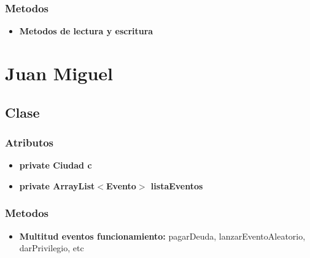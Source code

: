 \documentclass[12pt,a4paper]{article}
\begin{document}
        \subsubsection{Metodos}
        \begin{itemize}
            \item \textbf{Metodos de lectura y escritura}
        \end{itemize}

\section{Juan Miguel}
    \subsection{Clase }
        \subsubsection{Atributos}
        \begin{itemize}
        \item \textbf{private Ciudad c} 
        \item \textbf{private ArrayList$<$Evento$>$ listaEventos}
        \end{itemize}
    \subsubsection{Metodos}
        \begin{itemize}
        \item \textbf{Multitud eventos funcionamiento: }pagarDeuda, lanzarEventoAleatorio, darPrivilegio, etc
        \end{itemize}
    
\end{document}
